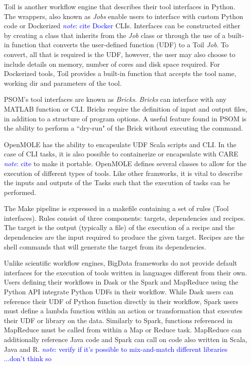 \documentclass{report}
\newcommand{\note}[1]{\textcolor{blue}{\textit{note}: #1}}
\begin{document}
            Toil is another workflow engine that describes their tool interfaces
            in Python. The wrappers, also known as \textit{Jobs} enable users to
            interface with custom Python code or Dockerized \note{cite Docker} 
            CLIs. Interfaces can be constructed either by creating a class that
            inherits from the \textit{Job} class or through the use of a 
            built-in function that converts the user-defined function (UDF) to a 
            Toil \textit{Job}. To convert, all that is required is the UDF,
            however, the user may also choose to include details on memory, 
            number of cores and disk space required. For Dockerized tools, Toil
            provides a built-in function that accepts the tool name, working dir
            and parameters of the tool.

            PSOM's tool interfaces are known as \textit{Bricks}. \textit{Bricks}
            can interface with any MATLAB function or CLI. Bricks require the
            definition of input and output files, in addition to a structure of
            program options. A useful feature found in PSOM is the ability 
            to perform a ``dry-run" of the Brick without executing the command.

            OpenMOLE has the ability to encapsulate UDF Scala scripts and CLI. 
            In the case of CLI tasks, it is also possible to containerize or 
            encapsulate with CARE \note{cite} to make it portable. OpenMOLE
            defines several classes to allow for the execution of different 
            types of tools. Like other framworks, it is vital to describe the
            inputs and outputs of the Tasks such that the execution of tasks 
            can be performed. 

            The Make pipeline is expressed in a makefile containing a set of 
            rules (Tool interfaces). Rules consist of three components: targets, 
            dependencies and recipes. The target is the output (typically a 
            file) of the 
            execution of a recipe and the dependencies are the input required to 
            produce the given target. Recipes are the shell commands that will
            generate the target from its dependencies. 

            Unlike scientific workflow engines, BigData frameworks do not 
            provide default interfaces for the execution of tools written in 
            languages different from their own. Users defining their workflows
            in Dask or the Spark and MapReduce using the Python API integrate
            Python UDFs in their workflow. While Dask users can reference their 
            UDF of Python function directly in their workflow, Spark users
            must define a lambda function within an action or transformation 
            that executes their UDF or library on the data. Similarly to Spark,
            functions referenced in MapReduce must be called from within a Map
            or Reduce task. MapReduce can additionally reference Java 
            code and Spark can call on code also written in Scala, Java and R.
            \note{verify if it's possible to mix-and-match different libraries
            ...don't think so} 
\end{document}
